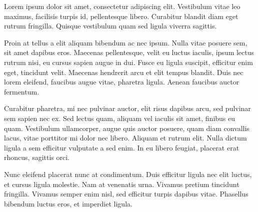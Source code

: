 Lorem ipsum dolor sit amet, consectetur adipiscing elit. Vestibulum vitae leo maximus, facilisis turpis id, pellentesque libero. Curabitur blandit diam eget rutrum fringilla. Quisque vestibulum quam sed ligula viverra sagittis.

Proin at tellus a elit aliquam bibendum ac nec ipsum. Nulla vitae posuere sem, sit amet dapibus eros. Maecenas pellentesque, velit eu luctus iaculis, ipsum lectus rutrum nisi, eu cursus sapien augue in dui. Fusce eu ligula suscipit, efficitur enim eget, tincidunt velit. Maecenas hendrerit arcu et elit tempus blandit. Duis nec lorem eleifend, faucibus augue vitae, pharetra ligula. Aenean faucibus auctor fermentum.

Curabitur pharetra, mi nec pulvinar auctor, elit risus dapibus arcu, sed pulvinar sem sapien nec ex. Sed lectus quam, aliquam vel iaculis sit amet, finibus eu quam. Vestibulum ullamcorper, augue quis auctor posuere, quam diam convallis lacus, vitae porttitor mi dolor nec libero. Aliquam et rutrum elit. Nulla dictum ligula a sem efficitur vulputate a sed enim. In eu libero feugiat, placerat erat rhoncus, sagittis orci.

Nunc eleifend placerat nunc at condimentum. Duis efficitur ligula nec elit luctus, et cursus ligula molestie. Nam at venenatis urna. Vivamus pretium tincidunt fringilla. Vivamus semper enim nisl, sed efficitur turpis dapibus vitae. Phasellus bibendum luctus eros, et imperdiet ligula.
